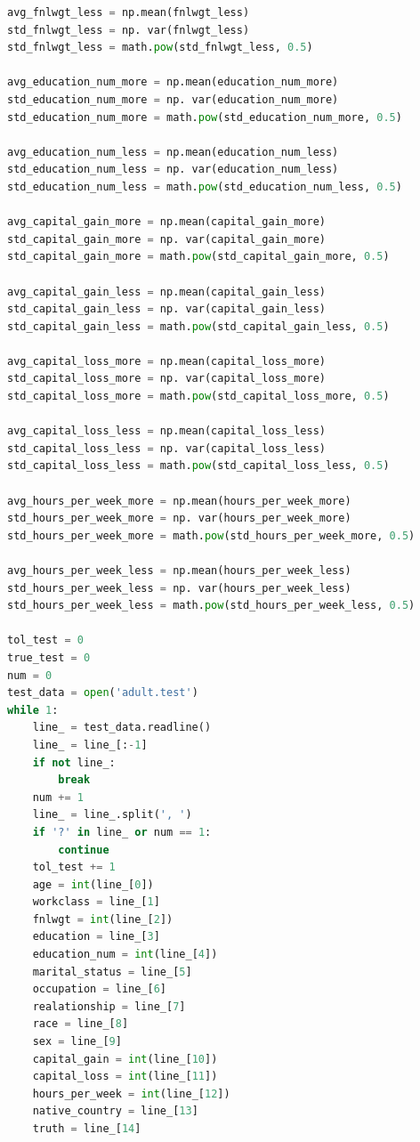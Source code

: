 ﻿\documentclass[a4paper, 11pt]{article}
\begin{document}
\begin{lstlisting}[language=Python,frame=single]
avg_fnlwgt_less = np.mean(fnlwgt_less)
std_fnlwgt_less = np. var(fnlwgt_less)
std_fnlwgt_less = math.pow(std_fnlwgt_less, 0.5)

avg_education_num_more = np.mean(education_num_more)
std_education_num_more = np. var(education_num_more)
std_education_num_more = math.pow(std_education_num_more, 0.5)

avg_education_num_less = np.mean(education_num_less)
std_education_num_less = np. var(education_num_less)
std_education_num_less = math.pow(std_education_num_less, 0.5)

avg_capital_gain_more = np.mean(capital_gain_more)
std_capital_gain_more = np. var(capital_gain_more)
std_capital_gain_more = math.pow(std_capital_gain_more, 0.5)

avg_capital_gain_less = np.mean(capital_gain_less)
std_capital_gain_less = np. var(capital_gain_less)
std_capital_gain_less = math.pow(std_capital_gain_less, 0.5)

avg_capital_loss_more = np.mean(capital_loss_more)
std_capital_loss_more = np. var(capital_loss_more)
std_capital_loss_more = math.pow(std_capital_loss_more, 0.5)

avg_capital_loss_less = np.mean(capital_loss_less)
std_capital_loss_less = np. var(capital_loss_less)
std_capital_loss_less = math.pow(std_capital_loss_less, 0.5)

avg_hours_per_week_more = np.mean(hours_per_week_more)
std_hours_per_week_more = np. var(hours_per_week_more)
std_hours_per_week_more = math.pow(std_hours_per_week_more, 0.5)

avg_hours_per_week_less = np.mean(hours_per_week_less)
std_hours_per_week_less = np. var(hours_per_week_less)
std_hours_per_week_less = math.pow(std_hours_per_week_less, 0.5)

tol_test = 0
true_test = 0
num = 0
test_data = open('adult.test')
while 1:
    line_ = test_data.readline()
    line_ = line_[:-1]
    if not line_:
        break
    num += 1
    line_ = line_.split(', ')
    if '?' in line_ or num == 1:
        continue
    tol_test += 1
    age = int(line_[0])
    workclass = line_[1]
    fnlwgt = int(line_[2])
    education = line_[3]
    education_num = int(line_[4])
    marital_status = line_[5]
    occupation = line_[6]
    realationship = line_[7]
    race = line_[8]
    sex = line_[9]
    capital_gain = int(line_[10])
    capital_loss = int(line_[11])
    hours_per_week = int(line_[12])
    native_country = line_[13]
    truth = line_[14]


\end{lstlisting}
\end{document}
